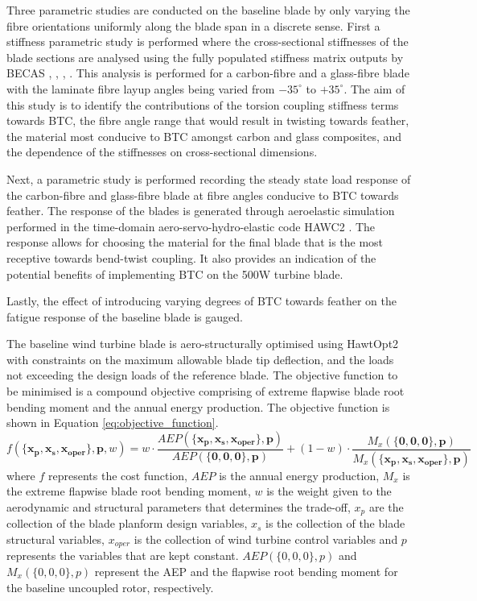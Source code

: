\documentclass[a4paper]{jpconf}
\begin{document}
Three parametric studies are conducted on the baseline blade by only varying the fibre orientations uniformly along the blade span in a discrete sense. First a stiffness parametric study is performed where the cross-sectional stiffnesses of the blade sections are analysed using the fully populated stiffness matrix outputs by BECAS \cite{becas1}, \cite{becas2}, \cite{becas3}, \cite{becas4}. This analysis is performed for a carbon-fibre and a glass-fibre blade with the laminate fibre layup angles being varied from $-35^\circ$ to $+35^\circ$. The aim of this study is to identify the contributions of the torsion coupling stiffness terms towards BTC, the fibre angle range that would result in twisting towards feather, the material most conducive to BTC amongst carbon and glass composites, and the dependence of the stiffnesses on cross-sectional dimensions.

Next, a parametric study is performed recording the steady state load response of the carbon-fibre and glass-fibre blade at fibre angles conducive to BTC towards feather. The response of the blades is generated through aeroelastic simulation performed in the time-domain aero-servo-hydro-elastic code HAWC2 \cite{hawc2}. The response allows for choosing the material for the final blade that is the most receptive towards bend-twist coupling. It also provides an indication of the potential benefits of implementing BTC on the 500W turbine blade.

Lastly, the effect of introducing varying degrees of BTC towards feather on the fatigue response of the baseline blade is gauged.

The baseline wind turbine blade is aero-structurally optimised using HawtOpt2 with constraints on the maximum allowable blade tip deflection, and the loads not exceeding the design loads of the reference blade. The objective function to be minimised is a compound objective comprising of extreme flapwise blade root bending moment and the annual energy production. The objective function is shown in Equation \ref{eq:objective_function}.
\begin{equation}
      f(\{\bm{x_p}, \bm{x_s}, \bm{x_{oper}}\},\bm{p}, w)= w \cdot \dfrac{AEP(\{\bm{x_p}, \bm{x_s}, \bm{x_{oper}}\},\bm{p})}{AEP(\{\bm{0},\bm{0},\bm{0}\},\bm{p})} + (1-w) \cdot \dfrac{M_x(\{\bm{0},\bm{0},\bm{0}\},\bm{p})}{M_x(\{\bm{x_p}, \bm{x_s}, \bm{x_{oper}}\},\bm{p})}
      \label{eq:objective_function}
\end{equation}
where $f$ represents the cost function, $AEP$ is the annual energy production, $M_x$ is the extreme flapwise blade root bending moment, $w$ is the weight given to the aerodynamic and structural parameters that determines the trade-off, $x_p$ are the collection of the blade planform design variables, $x_s$ is the collection of the blade structural variables, $x_{oper}$ is the collection of wind turbine control variables and $p$ represents the variables that are kept constant. $AEP(\{0,0,0\},p)$ and $M_x(\{0,0,0\},p)$ represent the AEP and the flapwise root bending moment for the baseline uncoupled rotor, respectively.
\end{document}
